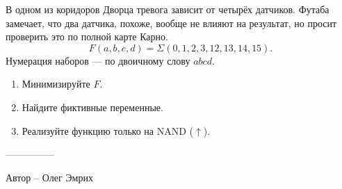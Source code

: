 \question
В одном из коридоров Дворца тревога зависит от четырёх датчиков. Футаба замечает, что два датчика, похоже, вообще не влияют на результат, но просит проверить это по полной карте Карно.
\[
F(a,b,c,d)=\Sigma(0,1,2,3,12,13,14,15).
\]
Нумерация наборов --- по двоичному слову $abcd$.
\begin{enumerate}
\item Минимизируйте $F$.
\item Найдите фиктивные переменные.
\item Реализуйте функцию только на NAND ($\uparrow$).
\end{enumerate}

---------------

Автор -- Олег Эмрих
